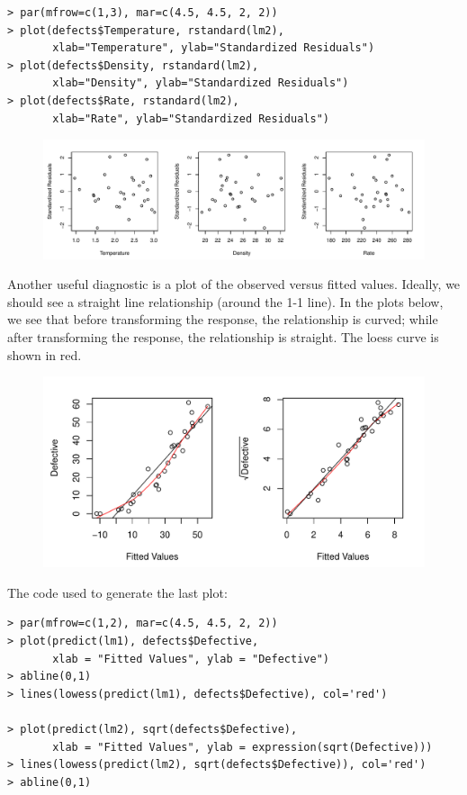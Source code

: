 \documentclass[10pt]{beamer}\usepackage[]{graphicx}\usepackage[]{color}
\begin{document}
\begin{frame}[fragile]
\scriptsize
\begin{verbatim}
> par(mfrow=c(1,3), mar=c(4.5, 4.5, 2, 2))
> plot(defects$Temperature, rstandard(lm2), 
       xlab="Temperature", ylab="Standardized Residuals")
> plot(defects$Density, rstandard(lm2), 
       xlab="Density", ylab="Standardized Residuals")
> plot(defects$Rate, rstandard(lm2), 
       xlab="Rate", ylab="Standardized Residuals")
\end{verbatim}
\begin{figure}
\includegraphics[scale=0.55]{figure/defects_resid_x2.pdf}
\end{figure}
\end{frame}

\begin{frame}
Another useful diagnostic is a plot of the observed versus fitted values.  Ideally, we should see a straight line relationship (around the 1-1 line).  In the plots below, we see that before transforming the response, the relationship is curved; while after transforming the response, the relationship is straight.  The loess curve is shown in red.
\begin{figure}
\includegraphics[scale=0.55]{figure/defects_obs_pred.pdf}
\end{figure}
\end{frame}

\begin{frame}[fragile]
The code used to generate the last plot:
\small
\begin{verbatim}
> par(mfrow=c(1,2), mar=c(4.5, 4.5, 2, 2))
> plot(predict(lm1), defects$Defective, 
       xlab = "Fitted Values", ylab = "Defective")
> abline(0,1)
> lines(lowess(predict(lm1), defects$Defective), col='red')

> plot(predict(lm2), sqrt(defects$Defective), 
       xlab = "Fitted Values", ylab = expression(sqrt(Defective)))
> lines(lowess(predict(lm2), sqrt(defects$Defective)), col='red')
> abline(0,1)
\end{verbatim}
\end{frame}
\end{document}
